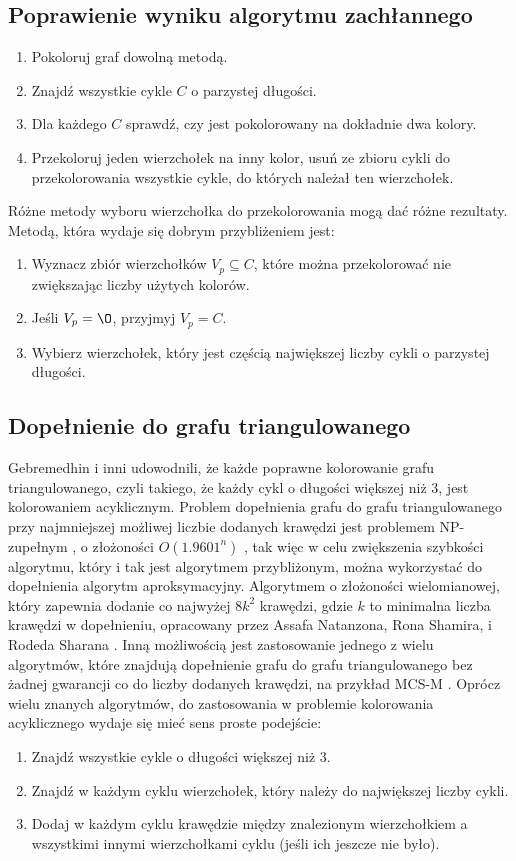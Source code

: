 \documentclass{article}
\begin{document}
\subsection{Poprawienie wyniku algorytmu zachłannego}
\begin{enumerate}
\item Pokoloruj graf dowolną metodą.
\item Znajdź wszystkie cykle $C$ o parzystej długości.
\item Dla każdego $C$ sprawdź, czy jest pokolorowany na dokładnie dwa kolory.
\item Przekoloruj jeden wierzchołek na inny kolor, usuń ze zbioru cykli do przekolorowania wszystkie cykle, do których należał ten wierzchołek.
\end{enumerate}
Różne metody wyboru wierzchołka do przekolorowania mogą dać różne rezultaty. Metodą, która wydaje się dobrym przybliżeniem jest:
\begin{enumerate}
\item Wyznacz zbiór wierzchołków $V_p \subseteq C$, które można przekolorować nie zwiększając liczby użytych kolorów.
\item Jeśli $V_p = \O$, przyjmyj $V_p = C$.
\item Wybierz wierzchołek, który jest częścią największej liczby cykli o parzystej długości.   
\end{enumerate}
\subsection{Dopełnienie do grafu triangulowanego}
Gebremedhin i inni udowodnili, że każde poprawne kolorowanie grafu triangulowanego, czyli takiego, że każdy cykl o długości większej niż 3, jest kolorowaniem acyklicznym. \cite{Gb}
Problem dopełnienia grafu do grafu triangulowanego przy najmniejszej możliwej liczbie dodanych krawędzi jest problemem NP-zupełnym \cite{NPC}, o złożoności $O(1.9601^n)$ \cite{Cmp}, tak więc w celu zwiększenia szybkości algorytmu, który i tak jest algorytmem przybliżonym, można wykorzystać do dopełnienia algorytm aproksymacyjny. Algorytmem o złożoności wielomianowej, który zapewnia dodanie co najwyżej $8k^2$ krawędzi, gdzie $k$ to minimalna liczba krawędzi w dopełnieniu, opracowany przez Assafa Natanzona, Rona Shamira, i Rodeda Sharana \cite{Approx}. Inną możliwością jest zastosowanie jednego z wielu algorytmów, które znajdują dopełnienie grafu do grafu triangulowanego bez żadnej gwarancji co do liczby dodanych krawędzi, na przykład MCS-M \cite{MCS-M}. Oprócz wielu znanych algorytmów, do zastosowania w problemie kolorowania acyklicznego wydaje się mieć sens proste podejście:
\begin{enumerate}
\item Znajdź wszystkie cykle o długości większej niż 3.
\item Znajdź w każdym cyklu wierzchołek, który należy do największej liczby cykli.
\item Dodaj w każdym cyklu krawędzie między znalezionym wierzchołkiem a wszystkimi innymi wierzchołkami cyklu (jeśli ich jeszcze nie było).
\end{enumerate}
\end{document}
